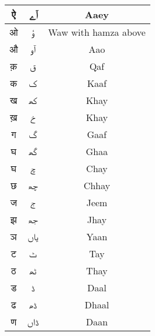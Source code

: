 \begin{longtable}[c]{|c|c|c|}
\textsanskrit{ऐ}               & \texturdu{آے}           & Aaey                        \\ \hline
\textsanskrit{ओ}               & \texturdu{ؤ}            & Waw with hamza above        \\ \hline
\textsanskrit{औ}               & \texturdu{آو}           & Aao                         \\ \hline
\textsanskrit{क़}               & \texturdu{ق}            & Qaf                         \\ \hline
\textsanskrit{क}               & \texturdu{ک}            & Kaaf                        \\ \hline
\textsanskrit{ख}               & \texturdu{کھ‍}          & Khay                        \\ \hline
\textsanskrit{ख़}               & \texturdu{خ}            & Khay                        \\ \hline
\textsanskrit{ग}               & \texturdu{گ}            & Gaaf                        \\ \hline
\textsanskrit{घ}               & \texturdu{گھ‍}          & Ghaa                        \\ \hline
\textsanskrit{घ}               & \texturdu{چ}            & Chay                        \\ \hline
\textsanskrit{छ}               & \texturdu{چھ}           & Chhay                       \\ \hline
\textsanskrit{ज}               & \texturdu{ج}            & Jeem                        \\ \hline
\textsanskrit{झ}               & \texturdu{جھ}           & Jhay                        \\ \hline
\textsanskrit{ञ}               & \texturdu{ياں}          & Yaan                        \\ \hline
\textsanskrit{ट}               & \texturdu{ٹ}            & Tay                         \\ \hline
\textsanskrit{ठ}               & \texturdu{ٹھ‍}          & Thay                        \\ \hline
\textsanskrit{ड}               & \texturdu{ڈ}            & Daal                        \\ \hline
\textsanskrit{ढ}               & \texturdu{ڈھ‍}          & Dhaal                       \\ \hline
\textsanskrit{ण}               & \texturdu{ڈاں}          & Daan                        \\ \hline

\end{longtable}
